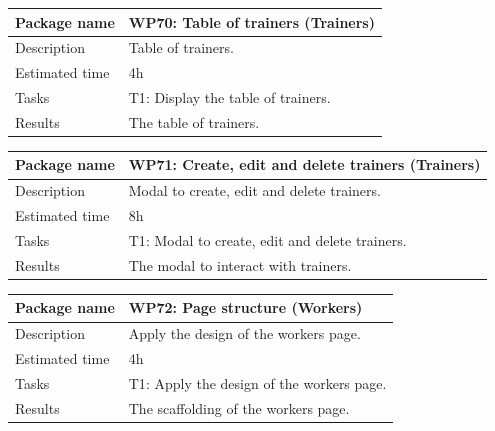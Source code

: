 \documentclass[a4paper, 12pt, oneside]{book}
\begin{document}
\vspace*{16pt}
\begin{tabularx}{\textwidth}{| l | X |}
	\hline
	\rowcolor{rowColor}
	{\semibf Package name}   & {\semibf WP70}: Table of trainers (Trainers) \\
	\hline
	{\semibf Description}    & Table of trainers.                           \\
	\hline
	\rowcolor{rowColor}
	{\semibf Estimated time} & 4h                                           \\
	\hline
	{\semibf Tasks}          & {\semibf T1}: Display the table of trainers. \\
	\hline
	\rowcolor{rowColor}
	{\semibf Results}        & The table of trainers.                       \\
	\hline
\end{tabularx}
\vspace*{16pt}
\begin{tabularx}{\textwidth}{| l | X |}
	\hline
	\rowcolor{rowColor}
	{\semibf Package name}   & {\semibf WP71}: Create, edit and delete trainers (Trainers) \\
	\hline
	{\semibf Description}    & Modal to create, edit and delete trainers.                  \\
	\hline
	\rowcolor{rowColor}
	{\semibf Estimated time} & 8h                                                          \\
	\hline
	{\semibf Tasks}          & {\semibf T1}: Modal to create, edit and delete trainers.    \\
	\hline
	\rowcolor{rowColor}
	{\semibf Results}        & The modal to interact with trainers.                        \\
	\hline
\end{tabularx}
\vspace*{16pt}
\begin{tabularx}{\textwidth}{| l | X |}
	\hline
	\rowcolor{rowColor}
	{\semibf Package name}   & {\semibf WP72}: Page structure (Workers)            \\
	\hline
	{\semibf Description}    & Apply the design of the workers page.               \\
	\hline
	\rowcolor{rowColor}
	{\semibf Estimated time} & 4h                                                  \\
	\hline
	{\semibf Tasks}          & {\semibf T1}: Apply the design of the workers page. \\
	\hline
	\rowcolor{rowColor}
	{\semibf Results}        & The scaffolding of the workers page.                \\
	\hline
\end{tabularx}
\end{document}
